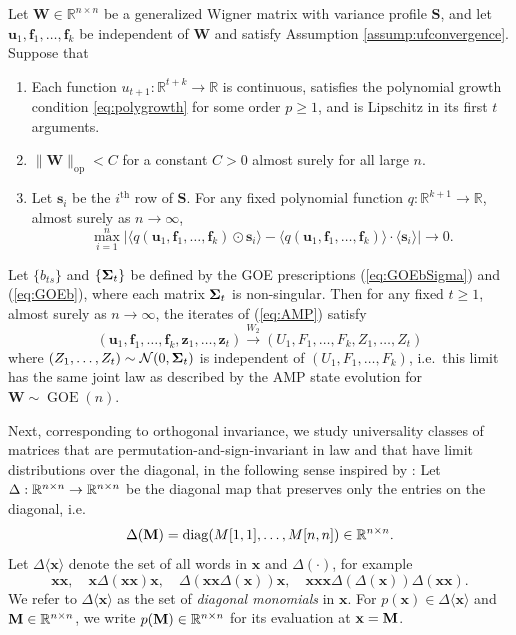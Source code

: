 \documentclass[10pt,reqno]{amsart}
\def\s{\mathbf{s}}
\def\u{\mathbf{u}}
\def\x{\mathbf{x}}
\def\z{\mathbf{z}}
\def\f{\mathbf{f}}
\def\W{\mathbf{W}}
\def\S{\mathbf{S}}
\def\R{\mathbb{R}}
\def\diag{\operatorname{diag}}
\def\op{\mathrm{op}}
\def\Normal{\mathcal{N}}
\def\GOE{\operatorname{GOE}}
\def\toWtwo{\overset{W_2}{\to}}
\def\bx{\mathbf{x}}
\begin{document}
\begin{theorem}\label{thm:Wigner}
Let $\W \in \R^{n \times n}$ be a generalized Wigner matrix with variance
profile $\S$, and let $\u_1,\f_1,\ldots,\f_k$ be independent of $\W$
and satisfy Assumption \ref{assump:ufconvergence}. Suppose that
\begin{enumerate}
\item Each function $u_{t+1}:\R^{t+k} \to \R$ is continuous, satisfies the 
polynomial growth condition \eqref{eq:polygrowth} for some order $p \geq 1$, 
and is Lipschitz in its first $t$ arguments.
\item $\|\W\|_\op<C$ for a constant $C>0$ almost surely for all large $n$.
\item Let $\s_i$ be the $i^\text{th}$ row of $\S$. For any fixed
polynomial function $q:\R^{k+1} \to \R$, almost surely as $n \to \infty$,
\begin{equation}\label{eq:Wignerunaligned}
\max_{i=1}^n \Big|\langle q(\u_1,\f_1,\ldots,\f_k) \odot \s_i \rangle
-\langle q(\u_1,\f_1,\ldots,\f_k) \rangle \cdot \langle \s_i \rangle
\Big| \to 0.
\end{equation}
\end{enumerate}
Let $\{b_{ts}\}$ and $\{\bm{\Sigma}_t\}$ be defined by the GOE prescriptions
(\ref{eq:GOEbSigma}) and (\ref{eq:GOEb}), where each matrix $\bm{\Sigma}_t$ is
non-singular. Then for any fixed $t \geq 1$, almost surely as $n \to \infty$,
the iterates of (\ref{eq:AMP}) satisfy
\[(\u_1,\f_1,\ldots,\f_k,\z_1,\ldots,\z_t) \toWtwo
(U_1,F_1,\ldots,F_k,Z_1,\ldots,Z_t)\]
where $(Z_1,\ldots,Z_t) \sim \Normal(0,\bSigma_t)$ is independent of
$(U_1,F_1,\ldots,F_k)$, i.e.\ this limit has the same joint law as described 
by the AMP state evolution for $\W \sim \GOE(n)$.
\end{theorem}

Next, corresponding to orthogonal invariance,
we study universality classes of matrices that are permutation-and-sign-invariant
in law
and that have limit distributions over the diagonal, in the following sense
inspired by \cite{au2021freeness}:
Let $\Delta: \mathbb{R}^{n\times n} \to \mathbb{R}^{n\times n}$ be the diagonal map that
preserves only the entries on the diagonal, i.e.
\[\Delta(\bM)=\diag(M[1,1],\ldots,M[n,n]) \in \R^{n \times n}.\]
Let $\Delta \langle \x \rangle$ denote the set of all words in $\x$ and
$\Delta(\cdot)$, for example
\[\x\x, \quad \x\Delta(\x\x)\x, \quad \Delta(\x\x\Delta(\x))\x,
\quad \x\x\x\Delta(\Delta(\x))\Delta(\x\x).\]
We refer to $\Delta\langle \x \rangle$ as the set of \emph{diagonal monomials}
in $\x$. For $p(\bx) \in \Delta\langle \x \rangle$ and $\bM \in \R^{n \times n}$,
we write $p(\bM) \in \R^{n \times n}$ for its evaluation at $\x=\bM$.
\end{document}
